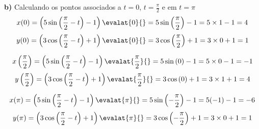 \documentclass[a4paper,12pt,fleqn]{article}
\begin{document}
\begin{answer}
\bigskip
\textbf{b)} \quad
Calculando os pontos associados a $t=0$, $t=\frac{\pi}{2}$ e em $t=\pi$
\[
  x(0)
  = \left(5 \sin\left(\frac{\pi}{2}-t\right) - 1\right)\evalat{0}{}
  = 5 \sin\left(\frac{\pi}{2}\right) - 1
  = 5 \times 1 - 1
  = 4
\]
\[
  y(0)
  = \left(3 \cos\left(\frac{\pi}{2}-t\right) + 1\right)\evalat{0}{}
  = 3 \cos\left(\frac{\pi}{2}\right) + 1
  = 3 \times 0 + 1
  = 1
\]

\medskip
\[
  x\left(\frac{\pi}{2}\right)
  = \left(5 \sin\left(\frac{\pi}{2}-t\right) - 1\right)\evalat{\frac{\pi}{2}}{}
  = 5 \sin\left(0\right) - 1
  = 5 \times 0 - 1
  = -1
\]
\[
  y\left(\frac{\pi}{2}\right)
  = \left(3 \cos\left(\frac{\pi}{2}-t\right) + 1\right)\evalat{\frac{\pi}{2}}{}
  = 3 \cos\left(0\right) + 1
  = 3 \times 1 + 1
  = 4
\]

\medskip
\[
  x(\pi)
  = \left(5 \sin\left(\frac{\pi}{2}-t\right) - 1\right)\evalat{\pi}{}
  = 5 \sin\left(-\frac{\pi}{2}\right) - 1
  = 5 (-1) - 1
  = -6
\]
\[
  y(\pi)
  = \left(3 \cos\left(\frac{\pi}{2}-t\right) + 1\right)\evalat{\pi}{}
  = 3 \cos\left(-\frac{\pi}{2}\right) + 1
  = 3 \times 0 + 1
  = 1
\]
\end{answer}
\end{document}
